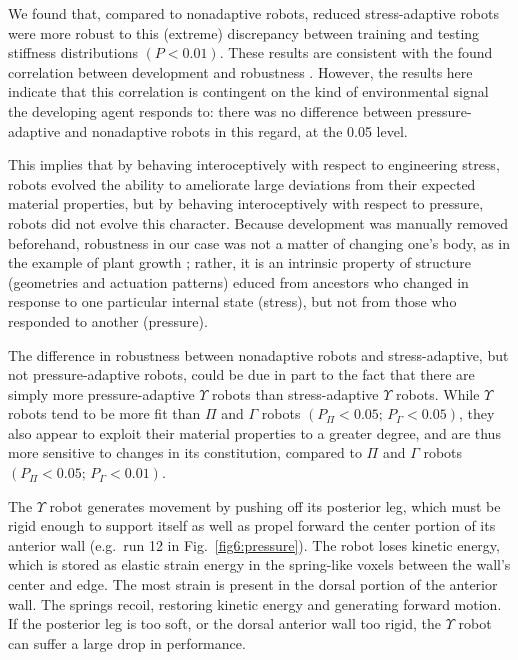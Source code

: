 We found that, compared to nonadaptive robots, reduced stress-adaptive robots 
were 
more robust to this (extreme) discrepancy between training and testing stiffness distributions $(P < 0.01)$.
These results are consistent with the 
found correlation between development and robustness
\cite{miller2004evolving,bongard2011morphological,kriegman2017morphological}.
However, the results here indicate that this correlation is contingent on the kind of environmental
signal the developing agent responds to: there was no difference between pressure-adaptive and nonadaptive robots in this regard, at the 0.05 level.

This implies that by behaving interoceptively with respect to engineering stress, robots evolved the ability to ameliorate large deviations from their expected material properties, but by behaving interoceptively with respect to pressure, robots did not evolve this character.
Because development was manually removed beforehand, robustness in our case was not a matter of changing one's body, as in the example of plant growth \citep{sultan2000phenotypic}; rather, it is an intrinsic property of structure (geometries and actuation patterns) educed from ancestors who changed in response to one particular internal state (stress), but not from those who responded to another (pressure).


The difference in robustness between nonadaptive robots and stress-adaptive, but not pressure-adaptive robots, could be due in part to the fact that there are simply more pressure-adaptive $\Upsilon$ robots than stress-adaptive $\Upsilon$ robots.
While $\Upsilon$ robots tend to be more fit than $\Pi$ and $\Gamma$ robots $(P_{\Pi}<0.05;\, P_{\Gamma}<0.05)$,
they also appear to exploit their material properties to a greater degree, and are thus more sensitive to changes in its constitution, compared to $\Pi$ and $\Gamma$ robots $(P_{\Pi}<0.05;\, P_{\Gamma}<0.01)$.

The $\Upsilon$ robot generates movement by pushing off its posterior leg,
which must be rigid enough to support itself as well as 
propel forward the center portion of its anterior wall 
(e.g.~run 12 in Fig.~\ref{fig6:pressure}).
The robot loses kinetic energy, which is stored as elastic strain energy in the spring-like voxels between the wall's center and edge.
The most strain is present in the dorsal portion of the anterior wall.
The springs recoil, restoring kinetic energy and generating forward motion.
If the posterior leg is too soft, or the dorsal anterior wall too rigid, the $\Upsilon$ robot can suffer a large drop in performance.


